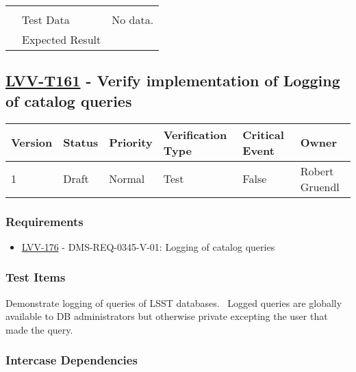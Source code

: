 \begin{longtable}[]{p{1.3cm}p{2cm}p{13cm}}
\begin{minipage}[t]{13cm}
{            \vspace{\dp0}
            } \end{minipage} \\ \cline{2-3}
            & Test Data &
            \begin{minipage}[t]{13cm}{\footnotesize
                No data.
                \vspace{\dp0}
            } \end{minipage} \\ \cline{2-3}
            & Expected Result &
        \\ \midrule
    \end{longtable}

\subsection{\href{https://jira.lsstcorp.org/secure/Tests.jspa\#/testCase/LVV-T161}{LVV-T161}
    - Verify implementation of Logging of catalog queries}\label{lvv-t161}

\begin{longtable}[]{llllll}
\toprule
Version & Status & Priority & Verification Type & Critical Event & Owner
\\\midrule
1 & Draft & Normal &
Test & False & Robert Gruendl
\\\bottomrule
\end{longtable}

\subsubsection{Requirements}
\begin{itemize}
\item \href{https://jira.lsstcorp.org/browse/LVV-176}{LVV-176} - DMS-REQ-0345-V-01: Logging of catalog queries
\end{itemize}

\subsubsection{Test Items}
Demonstrate logging of queries of LSST databases. ~Logged queries are
globally available to DB administrators but otherwise private excepting
the user that made the query.



\subsubsection{Intercase Dependencies}

